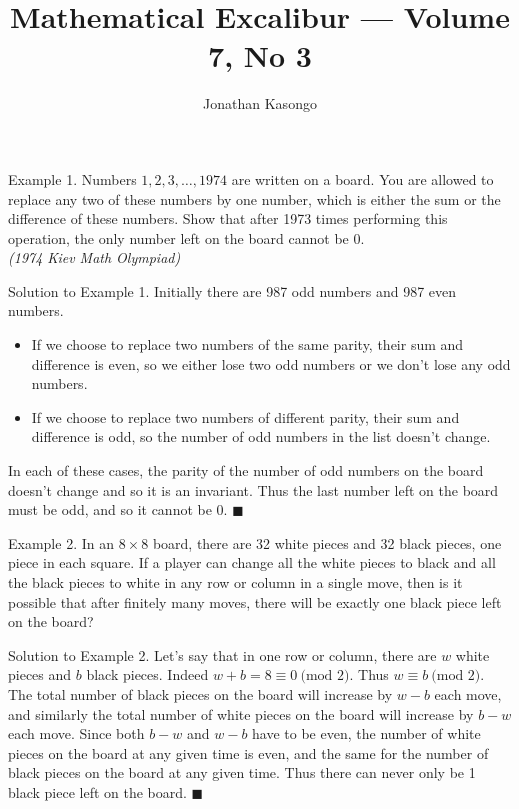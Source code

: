 \documentclass{article}
\author{Jonathan Kasongo}
\title{Mathematical Excalibur --- Volume 7, No 3}
\begin{document}
\maketitle

\begin{problem}{Example 1.}
Numbers $1, 2, 3, \ldots, 1974$ are written on
a board. You are allowed to replace any
two of these numbers by one number,
which is either the sum or the difference
of these numbers. Show that after 1973
times performing this operation, the only
number left on the board cannot be 0.
\\

\textit{(1974 Kiev Math Olympiad)}
\end{problem}

\begin{solution}{Solution to Example 1.}
Initially there are 987 odd numbers and 987 even numbers.

\begin{itemize}
\item If we choose to replace two numbers of the same parity, their sum and
difference is even, so we either lose two odd numbers or we don't lose any
odd numbers.
\item If we choose to replace two numbers of different parity, their
sum and difference is odd, so the number of odd numbers in the list
doesn't change.
\end{itemize}

In each of these cases, the parity of the number of odd numbers on the board
doesn't change and so it is an invariant. Thus the last number left on the
board must be odd, and so it cannot be 0. $\blacksquare$
\end{solution}
\vspace{0.2cm}

\begin{problem}{Example 2.}
In an $8 \times 8$ board, there are
32 white pieces and 32 black pieces, one
piece in each square. If a player can
change all the white pieces to black and
all the black pieces to white in any row
or column in a single move, then is it
possible that after finitely many moves,
there will be exactly one black piece left
on the board?
\end{problem}

\begin{solution}{Solution to Example 2.}
Let's say that in one row or column, there are $w$ white pieces and $b$
black pieces. Indeed $w + b = 8 \equiv 0 \ \text{(mod } 2)$. Thus
$w \equiv b \ \text{(mod } 2)$. The total number of black pieces on the
board will increase by $w-b$ each move, and similarly the total number of
white pieces on the board will increase by $b-w$ each move. Since both
$b-w$ and $w-b$ have to be even, the number of white pieces on the board at
any given time is even, and the same for the number of black pieces on the
board at any given time. Thus there can never only be 1 black piece left
on the board. $\blacksquare$
\end{solution}
\vspace{0.2cm}
\end{document}

